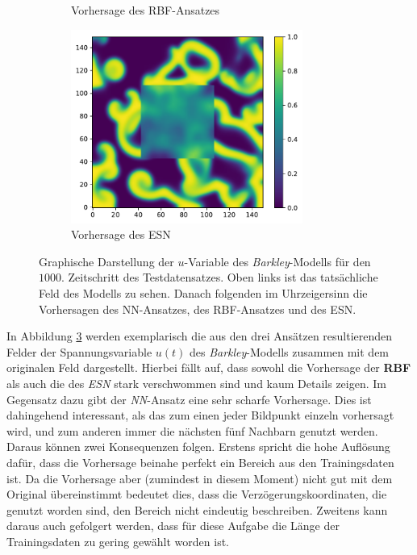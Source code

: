 \begin{figure}[h]
\begin{subfigure}{.5\textwidth}
		\setcapmargin[1cm]{0.5cm}
  		\caption{Vorhersage des \textsc{RBF}-Ansatzes}
  		\label{fig:exp_inner_cross_barkley_result_rbf_pred}
	\end{subfigure}%
	\begin{subfigure}{.5\textwidth}
		\centering
		\includegraphics[height=2.5in]{figures/results/inner_cross_prediction/barkley_u_inner_esn.pdf}
		\setcapmargin[1cm]{0.5cm}
  		\caption{Vorhersage des \textsc{ESN}}
  		\label{fig:exp_inner_cross_barkley_result_esn_pred}
	\end{subfigure}
	\caption{Graphische Darstellung der $u$-Variable des \textit{Barkley}-Modells für den $1000$. Zeitschritt des Testdatensatzes. Oben links ist das tatsächliche Feld des Modells zu sehen. Danach folgenden im Uhrzeigersinn die Vorhersagen des \textsc{NN}-Ansatzes, des \textsc{RBF}-Ansatzes und des \textsc{ESN}.}
	\label{fig:exp_inner_cross_barkley_result}
\end{figure} 

In Abbildung \ref{fig:exp_inner_cross_barkley_result} werden exemplarisch die aus den drei Ansätzen resultierenden Felder der Spannungsvariable $u(t)$ des \textit{Barkley}-Modells zusammen mit dem originalen Feld dargestellt. Hierbei fällt auf, dass sowohl die Vorhersage der \textbf{RBF} als auch die des \textit{ESN} stark verschwommen sind und kaum Details zeigen. Im Gegensatz dazu gibt der \textit{NN}-Ansatz eine sehr scharfe Vorhersage. Dies ist dahingehend interessant, als das zum einen jeder Bildpunkt einzeln vorhersagt wird, und zum anderen immer die nächsten fünf Nachbarn genutzt werden. Daraus können zwei Konsequenzen folgen. Erstens spricht die hohe Auflösung dafür, dass die Vorhersage beinahe perfekt ein Bereich aus den Trainingsdaten ist. Da die Vorhersage aber (zumindest in diesem Moment) nicht gut mit dem Original übereinstimmt bedeutet dies, dass die Verzögerungskoordinaten, die genutzt worden sind, den Bereich nicht eindeutig beschreiben. Zweitens kann daraus auch gefolgert werden, dass für diese Aufgabe die Länge der Trainingsdaten zu gering gewählt worden ist. 
